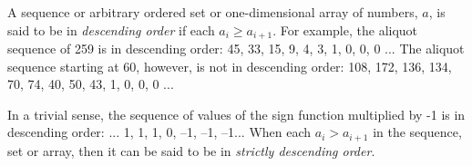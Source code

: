 \documentclass[12pt]{article}
\begin{document}
A sequence or arbitrary ordered set or one-dimensional array of numbers, $a$, is said to be in {\em descending order} if each $a_i \ge a_{i + 1}$. For example, the aliquot sequence of 259 is in descending order: 45, 33, 15, 9, 4, 3, 1, 0, 0, 0 ... The aliquot sequence starting at 60, however, is not in descending order: 108, 172, 136, 134, 70, 74, 40, 50, 43, 1, 0, 0, 0 ...

In a trivial sense, the sequence of values of the sign function multiplied by -1 is in descending order: ... 1, 1, 1, 0, --1, --1, --1... When each $a_i > a_{i + 1}$ in the sequence, set or array, then it can be said to be in {\em strictly descending order}.
\end{document}
